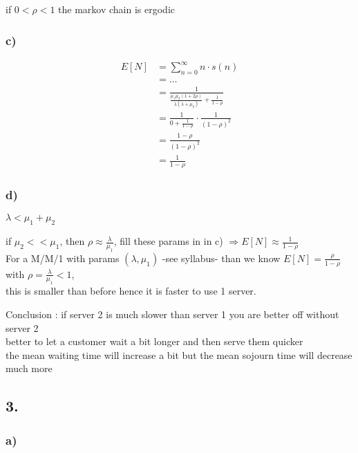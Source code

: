 if $0< \rho < 1$ the markov chain is ergodic

\subsubsection*{ c) }
\begin{align*}
E\left[N\right]&=\sum _{{n=0}}^{\infty }n\cdot s\left(n\right)\\
&=\ldots \\
&=\frac{1}{\frac{\mu _{1}\mu _{2}\left(1+2\rho \right)}{\lambda \left(\lambda +\mu _{2}\right)}+\frac{1}{1-\rho }}\\
&=\frac{1}{0+\frac{1}{1-\rho }}\cdot \frac{1}{\left(1-\rho \right)^{2}}\\
&=\frac{1-\rho }{\left(1-\rho \right)^{2}}\\
&=\frac{1}{1-\rho }
\end{align*}
\subsubsection*{ d) }

$\lambda < \mu _{1}+\mu _{2}$

if $\mu _{2}< < \mu _{1}$, then $\rho \approx \frac{\lambda }{\mu _{1}}$, fill these params in in c) $\Rightarrow E\left[N\right]\approx \frac{1}{1-\rho }$\\
For a M/M/1 with params $\left(\lambda ,\mu _{1}\right)$ -see syllabus- than we know $E\left[N\right]=\frac{\rho }{1-\rho }$ with $\rho =\frac{\lambda }{\mu _{1}}< 1$,\\
this is smaller than before hence it is faster to use 1 server.

Conclusion : if server 2 is much slower than server 1 you are better off without server 2\\
better to let a customer wait a bit longer and then serve them quicker\\
the mean waiting time will increase a bit but the mean sojourn time will decrease much more\\

\subsection*{ 3. }

\subsubsection*{ a) }

